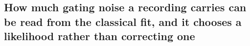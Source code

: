 \subsection*{How much gating noise a recording carries can be read from the classical fit, and it chooses a likelihood rather than correcting one}
\begin{figure}[htbp]
\begin{fullwidth}
\centering

\end{fullwidth}
\end{figure}
